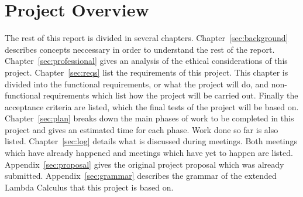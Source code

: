 \section{Project Overview}
The rest of this report is divided in several chapters.
Chapter~\ref{sec:background} describes concepts neccessary in order to
understand the rest of the report.  Chapter~\ref{sec:professional} gives an
analysis of the ethical considerations of this project. Chapter~\ref{sec:reqs}
list the requirements of this project.  This chapter is divided into the
functional requirements, or what the project will do, and non-functional
requirements which list how the project will be carried out. Finally the
acceptance criteria are listed, which the final tests of the project will be
based on. Chapter~\ref{sec:plan} breaks down the main phases of work to be
completed in this project and gives an estimated time for each phase. Work done
so far is also listed. Chapter~\ref{sec:log} details what is discussed during
meetings. Both meetings which have already happened and meetings which have yet
to happen are listed. Appendix~\ref{sec:proposal} gives the original project
proposal which was already submitted. Appendix~\ref{sec:grammar} describes the
grammar of the extended Lambda Calculus that this project is based on.
